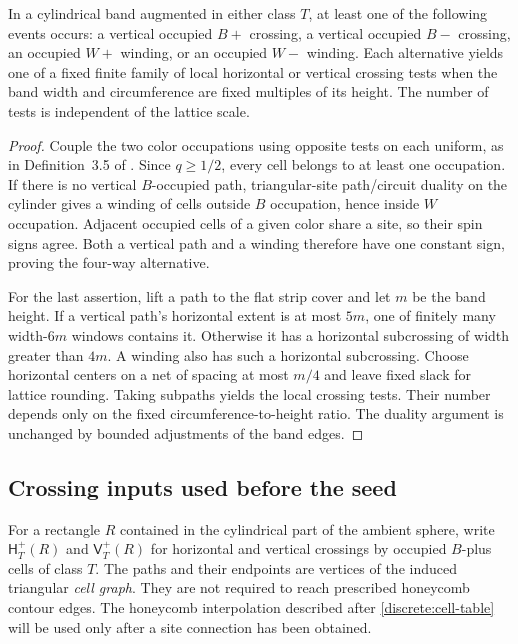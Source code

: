 \begin{lemma}\label{annulus:duality}
In a cylindrical band augmented in either class $T$, at least one of the
following events occurs: a vertical occupied $B+$ crossing, a vertical
occupied $B-$ crossing, an occupied $W+$ winding, or an occupied $W-$
winding. Each alternative yields one of a fixed finite family of local
horizontal or vertical crossing tests when the band width and circumference
are fixed multiples of its height. The number of tests is independent of
the lattice scale.
\end{lemma}
\begin{proof}
Couple the two color occupations using opposite tests on each uniform, as
in Definition~3.5 of \cite{GL2025}. Since $q\ge1/2$, every cell belongs
to at least one occupation. If there is no vertical $B$-occupied path,
triangular-site path/circuit duality on the cylinder gives a winding of
cells outside $B$ occupation, hence inside $W$ occupation. Adjacent occupied
cells of a given color share a site, so their spin signs agree. Both a
vertical path and a winding therefore have one constant sign, proving the
four-way alternative.

For the last assertion, lift a path to the flat strip cover and let $m$
be the band height. If a vertical path's horizontal extent is at most
$5m$, one of finitely many width-$6m$ windows contains it. Otherwise it
has a horizontal subcrossing of width greater than $4m$. A winding also
has such a horizontal subcrossing. Choose horizontal centers on a net of
spacing at most $m/4$ and leave fixed slack for lattice rounding. Taking
subpaths yields the local crossing tests. Their number depends only on
the fixed circumference-to-height ratio. The duality argument is
unchanged by bounded adjustments of the band edges.
\end{proof}

\subsection{Crossing inputs used before the seed}
\label{annulus:inputs}

For a rectangle $R$ contained in the cylindrical part of the ambient
sphere, write $\mathsf H_T^+(R)$ and $\mathsf V_T^+(R)$ for horizontal
and vertical crossings by occupied $B$-plus cells of class $T$.
The paths and their endpoints are vertices of the induced triangular
\emph{cell graph}.  They are not required to reach prescribed honeycomb
contour edges.  The honeycomb interpolation described after
\eqref{discrete:cell-table} will be used only after a site connection has
been obtained.

